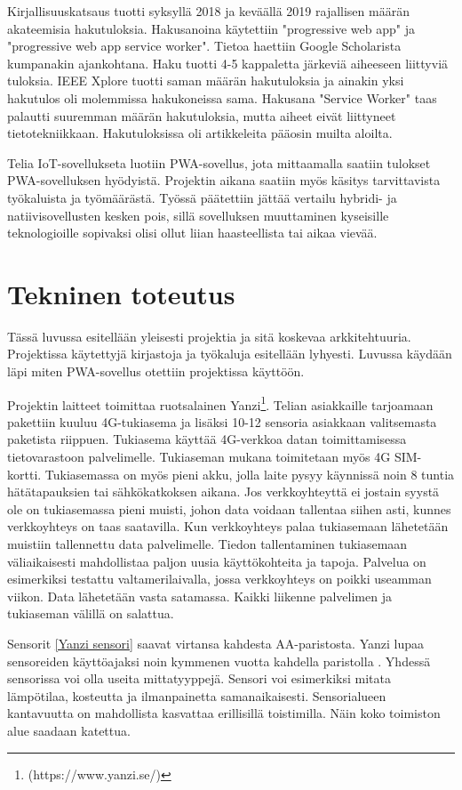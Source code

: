\documentclass{tktltiki}
\begin{document}
Kirjallisuuskatsaus tuotti syksyllä 2018 ja keväällä 2019 rajallisen määrän akateemisia hakutuloksia. Hakusanoina käytettiin "progressive web app" ja "progressive web app service worker". Tietoa haettiin Google Scholarista kumpanakin ajankohtana. Haku tuotti 4-5 kappaletta järkeviä aiheeseen liittyviä tuloksia.  IEEE Xplore tuotti saman määrän hakutuloksia ja ainakin yksi hakutulos oli molemmissa hakukoneissa sama. Hakusana "Service Worker" taas palautti suuremman määrän hakutuloksia, mutta aiheet eivät liittyneet tietotekniikkaan. Hakutuloksissa oli artikkeleita pääosin muilta aloilta. 

Telia IoT-sovellukseta luotiin PWA-sovellus, jota mittaamalla saatiin tulokset PWA-sovelluksen hyödyistä. Projektin aikana saatiin myös käsitys tarvittavista työkaluista ja työmäärästä. Työssä päätettiin jättää vertailu hybridi- ja natiivisovellusten kesken pois, sillä sovelluksen muuttaminen kyseisille teknologioille sopivaksi olisi ollut liian haasteellista tai aikaa vievää.

\newpage
\section{Tekninen toteutus}

Tässä luvussa esitellään yleisesti projektia ja sitä koskevaa arkkitehtuuria. Projektissa käytettyjä kirjastoja ja työkaluja esitellään lyhyesti. Luvussa käydään läpi miten PWA-sovellus otettiin projektissa käyttöön.

Projektin laitteet toimittaa ruotsalainen Yanzi\footnote[1]{(https://www.yanzi.se/)}. Telian asiakkaille tarjoamaan pakettiin kuuluu 4G-tukiasema ja lisäksi 10-12 sensoria asiakkaan valitsemasta paketista riippuen. Tukiasema käyttää 4G-verkkoa datan toimittamisessa tietovarastoon palvelimelle. Tukiaseman mukana toimitetaan myös 4G SIM-kortti. Tukiasemassa on myös pieni akku, jolla laite pysyy käynnissä noin 8 tuntia hätätapauksien tai sähkökatkoksen aikana. Jos verkkoyhteyttä ei jostain syystä ole on tukiasemassa pieni muisti, johon data voidaan tallentaa siihen asti, kunnes verkkoyhteys on taas saatavilla. Kun verkkoyhteys palaa tukiasemaan lähetetään muistiin tallennettu data palvelimelle. Tiedon tallentaminen tukiasemaan väliaikaisesti mahdollistaa paljon uusia käyttökohteita ja tapoja. Palvelua on esimerkiksi testattu valtamerilaivalla, jossa verkkoyhteys on poikki useamman viikon. Data lähetetään vasta satamassa. Kaikki liikenne palvelimen ja tukiaseman välillä on salattua.

Sensorit \ref{Yanzi sensori} saavat virtansa kahdesta AA-paristosta. Yanzi lupaa sensoreiden käyttöajaksi noin kymmenen vuotta kahdella paristolla \cite{Yanzi}. Yhdessä sensorissa voi olla useita mittatyyppejä. Sensori voi esimerkiksi mitata lämpötilaa, kosteutta ja ilmanpainetta samanaikaisesti. Sensorialueen kantavuutta on mahdollista kasvattaa erillisillä toistimilla. Näin koko toimiston alue saadaan katettua. 
\end{document}
